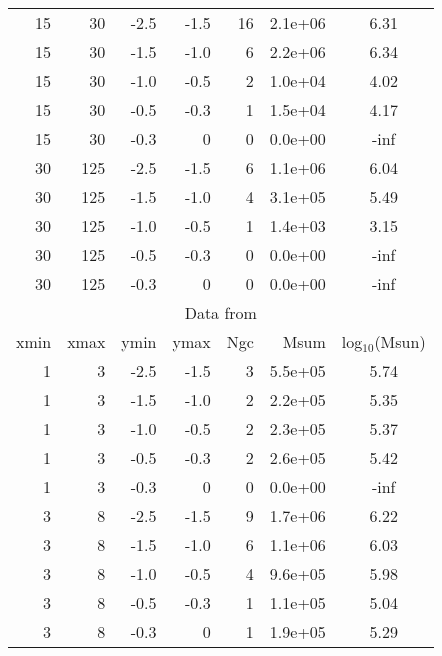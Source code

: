 \documentclass[12pt, a4paper]{article}
\begin{document}
{\begin{table}[ht!]
\begin{tabular}{rrrrrrc}
        \hline
        15     & 30     & -2.5   & -1.5   & 16     & 2.1e+06 & 6.31       \\
        15     & 30     & -1.5   & -1.0   & 6      & 2.2e+06 & 6.34       \\
        15     & 30     & -1.0   & -0.5   & 2      & 1.0e+04 & 4.02       \\
        15     & 30     & -0.5   & -0.3   & 1      & 1.5e+04 & 4.17       \\
        15     & 30     & -0.3   & 0      & 0      & 0.0e+00 & -inf       \\
        \hline
        30     & 125    & -2.5   & -1.5   & 6      & 1.1e+06 & 6.04       \\
        30     & 125    & -1.5   & -1.0   & 4      & 3.1e+05 & 5.49       \\
        30     & 125    & -1.0   & -0.5   & 1      & 1.4e+03 & 3.15       \\
        30     & 125    & -0.5   & -0.3   & 0      & 0.0e+00 & -inf       \\
        30     & 125    & -0.3   & 0      & 0      & 0.0e+00 & -inf       \\
        \hline
        \multicolumn{7}{c}{Data from \citet[][55 GCs]{2013ApJ...775..134V}} \\
        \hline
        xmin   & xmax   & ymin   & ymax   & Ngc    & Msum   & log$_{10}$(Msun) \\
        \hline
        1      & 3      & -2.5   & -1.5   & 3      & 5.5e+05 & 5.74       \\
        1      & 3      & -1.5   & -1.0   & 2      & 2.2e+05 & 5.35       \\
        1      & 3      & -1.0   & -0.5   & 2      & 2.3e+05 & 5.37       \\
        1      & 3      & -0.5   & -0.3   & 2      & 2.6e+05 & 5.42       \\
        1      & 3      & -0.3   & 0      & 0      & 0.0e+00 & -inf       \\
        \hline
        3      & 8      & -2.5   & -1.5   & 9      & 1.7e+06 & 6.22       \\
        3      & 8      & -1.5   & -1.0   & 6      & 1.1e+06 & 6.03       \\
        3      & 8      & -1.0   & -0.5   & 4      & 9.6e+05 & 5.98       \\
        3      & 8      & -0.5   & -0.3   & 1      & 1.1e+05 & 5.04       \\
        3      & 8      & -0.3   & 0      & 1      & 1.9e+05 & 5.29       \\

\end{tabular}
\end{table}}
\end{document}
